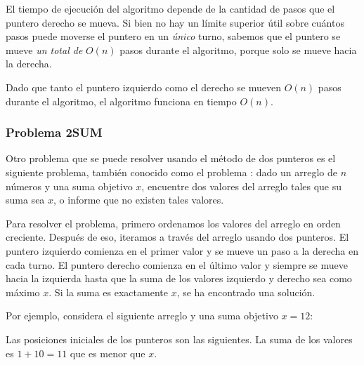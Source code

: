 El tiempo de ejecución del algoritmo depende de
la cantidad de pasos que el puntero derecho se mueva.
Si bien no hay un límite superior útil sobre cuántos pasos puede
moverse el puntero en un \emph{único} turno,
sabemos que el puntero se mueve \emph{un total de}
$O(n)$ pasos durante el algoritmo,
porque solo se mueve hacia la derecha.

Dado que tanto el puntero izquierdo como el derecho
se mueven $O(n)$ pasos durante el algoritmo,
el algoritmo funciona en tiempo $O(n)$.

\subsubsection{Problema 2SUM}


Otro problema que se puede resolver usando
el método de dos punteros es el siguiente problema,
también conocido como el problema :
dado un arreglo de $n$ números y
una suma objetivo $x$, encuentre
dos valores del arreglo tales que su suma sea $x$,
o informe que no existen tales valores.

Para resolver el problema, primero
ordenamos los valores del arreglo en orden creciente.
Después de eso, iteramos a través del arreglo usando
dos punteros.
El puntero izquierdo comienza en el primer valor
y se mueve un paso a la derecha en cada turno.
El puntero derecho comienza en el último valor
y siempre se mueve hacia la izquierda hasta que la suma de los
valores izquierdo y derecho sea como máximo $x$.
Si la suma es exactamente $x$,
se ha encontrado una solución.

\pagebreak
Por ejemplo, considera el siguiente arreglo
y una suma objetivo $x=12$:
\begin{center}
\end{center}

Las posiciones iniciales de los punteros
son las siguientes.
La suma de los valores es $1+10=11$
que es menor que $x$.

